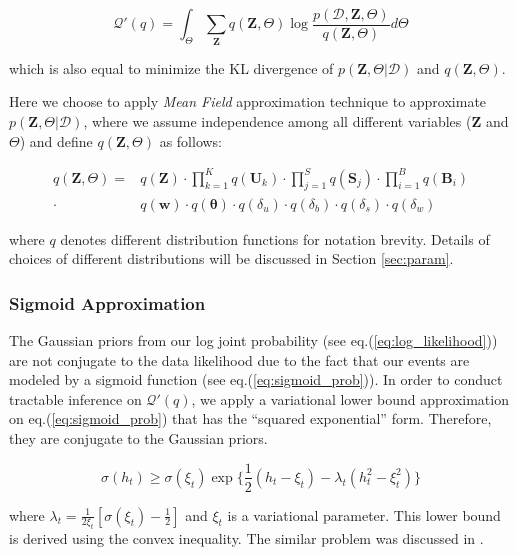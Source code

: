 \begin{equation}
\label{eq:original_variational_energy}
\mathcal{Q}'(q) = \int_\Theta \sum_{\bm{Z}} q(\bm{Z},\Theta) \log\frac{p(\mathcal{D},\bm{Z},\Theta)}{q(\bm{Z},\Theta)}d\Theta
\end{equation}

\noindent which is also equal to minimize the KL divergence of $p(\bm{Z}, \Theta| \mathcal{D})$ and $q(\bm{Z}, \Theta)$.

Here we choose to apply \emph{Mean Field} approximation technique to approximate $p(\bm{Z}, \Theta| \mathcal{D})$, where we assume independence among all different variables ($\mathbf{Z}$ and $\Theta$) and define $q(\bm{Z}, \Theta)$ as follows:

\begin{align}
\label{eq:mean_field}
q(\bm{Z}, \Theta) = & q(\mathbf{Z}) \cdot \prod_{k=1}^K q(\mathbf{U}_k) \cdot \prod_{j=1}^S q(\mathbf{S}_j) \cdot \prod_{i=1}^B q(\mathbf{B}_i) \nonumber \\
\cdot & q(\mathbf{w}) \cdot q(\boldsymbol{\theta}) \cdot q(\delta_u) \cdot q(\delta_b) \cdot q(\delta_s) \cdot q(\delta_w)
\end{align}

\noindent where $q$ denotes different distribution functions for notation brevity. Details of choices of different distributions will be discussed in Section \ref{sec:param}.

\subsubsection{Sigmoid Approximation}

The Gaussian priors from our log joint probability (see eq.(\ref{eq:log_likelihood})) are not conjugate to the data likelihood due to the fact that our events are modeled by a sigmoid function (see eq.(\ref{eq:sigmoid_prob})). In order to conduct tractable inference on $\mathcal{Q}'(q)$, we apply a variational lower bound approximation on eq.(\ref{eq:sigmoid_prob}) that has the ``squared exponential'' form. Therefore, they are conjugate to the Gaussian priors.

\begin{equation*}
\sigma(h_t) \geq \sigma(\xi_t)\exp\big\{\frac{1}{2}(h_t-\xi_t)-\lambda_t(h_t^2-\xi_t^2)\big\}
\end{equation*}

\noindent where $\lambda_t=\frac{1}{2\xi_t}[\sigma(\xi_t)-\frac{1}{2}]$ and $\xi_t$ is a variational parameter. This lower bound is derived using the convex inequality. The similar problem was discussed in \cite{jaakkola1997variational,jordan1999introduction}.


